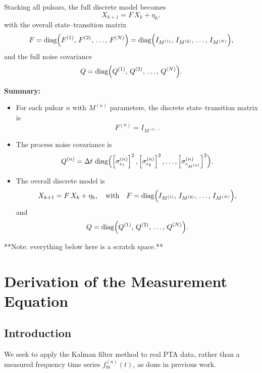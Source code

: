 \documentclass{tufte-handout} %
\begin{document}
Stacking all pulsars, the full discrete model becomes
\begin{equation}
X_{k+1} = F\,X_k + \eta_k,
\end{equation}
with the overall state--transition matrix
\begin{equation}
F = \operatorname{diag}\Bigl(F^{(1)},\,F^{(2)},\,\dots,\,F^{(N)}\Bigr)
= \operatorname{diag}\Bigl(I_{M^{(1)}},\,I_{M^{(2)}},\,\dots,\,I_{M^{(N)}}\Bigr),
\end{equation}
and the full noise covariance
\begin{equation}
Q = \operatorname{diag}\Bigl(Q^{(1)},\,Q^{(2)},\,\dots,\,Q^{(N)}\Bigr).
\end{equation}

\bigskip
\textbf{Summary:}
\begin{itemize}
    \item For each pulsar \(n\) with \(M^{(n)}\) parameters, the discrete state--transition matrix is
    \begin{equation}
    F^{(n)} = I_{M^{(n)}}.
    \end{equation}
    \item The process noise covariance is
    \begin{equation}
    Q^{(n)} = \Delta t\,\operatorname{diag}\Bigl(\left[\sigma_{\epsilon_1}^{(n)}\right]^2,\left[\sigma_{\epsilon_2}^{(n)}\right]^2,\dots,\left[\sigma_{\epsilon_{M^{(n)}}}^{(n)}\right]^2\Bigr).
    \end{equation}
    \item The overall discrete model is
    \begin{equation}
    X_{k+1} = F\,X_k + \eta_k, \quad \text{with} \quad F = \operatorname{diag}\Bigl(I_{M^{(1)}},\,I_{M^{(2)}},\,\dots,\,I_{M^{(N)}}\Bigr),
    \end{equation}
    and
    \begin{equation}
    Q = \operatorname{diag}\Bigl(Q^{(1)},\,Q^{(2)},\,\dots,\,Q^{(N)}\Bigr).
    \end{equation}
\end{itemize}




\newpage
\appendix 

**Note: everything below here is a scratch space.** 
\section{Derivation of the Measurement Equation}

\subsection{Introduction}
We seek to apply the Kalman filter method to real PTA data, rather than a measured frequency time series $f_{\textrm{m}}^{(n)}(t)$, as done in previous work. \newline 
\end{document}
